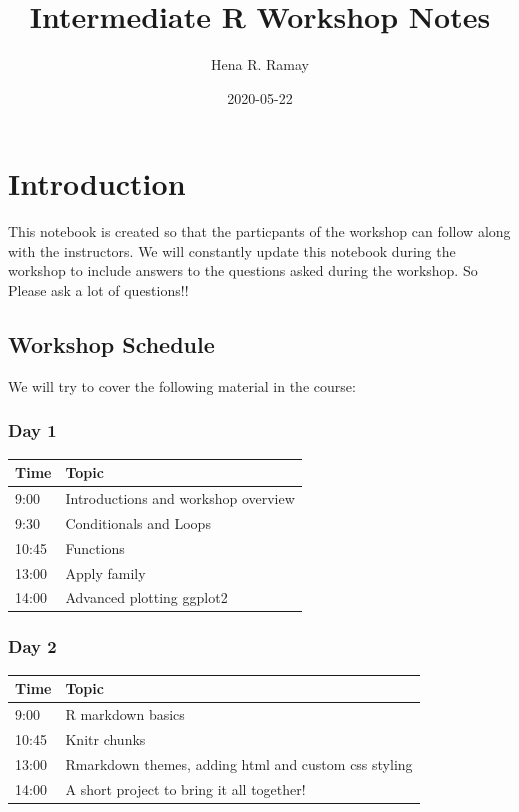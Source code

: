 \documentclass[
]{book}
\title{Intermediate R Workshop Notes}
\author{Hena R. Ramay}
\date{2020-05-22}
\begin{document}
\maketitle

{
\setcounter{tocdepth}{1}
\tableofcontents
}
\hypertarget{introduction}{%
\chapter{Introduction}\label{introduction}}

This notebook is created so that the particpants of the workshop can follow along with the instructors. We will constantly update this notebook during the workshop to include answers to the questions asked during the workshop. So Please ask a lot of questions!!

\hypertarget{workshop-schedule}{%
\section{Workshop Schedule}\label{workshop-schedule}}

We will try to cover the following material in the course:

\hypertarget{day-1}{%
\subsection*{Day 1}\label{day-1}}

\begin{longtable}[]{@{}ll@{}}
\toprule
Time & Topic\tabularnewline
\midrule
\endhead
9:00 & Introductions and workshop overview\tabularnewline
9:30 & Conditionals and Loops\tabularnewline
10:45 & Functions\tabularnewline
13:00 & Apply family\tabularnewline
14:00 & Advanced plotting ggplot2\tabularnewline
\bottomrule
\end{longtable}

\hypertarget{day-2}{%
\subsection*{Day 2}\label{day-2}}

\begin{longtable}[]{@{}ll@{}}
\toprule
Time & Topic\tabularnewline
\midrule
\endhead
9:00 & R markdown basics\tabularnewline
10:45 & Knitr chunks\tabularnewline
13:00 & Rmarkdown themes, adding html and custom css styling\tabularnewline
14:00 & A short project to bring it all together!\tabularnewline
\bottomrule
\end{longtable}
\end{document}
